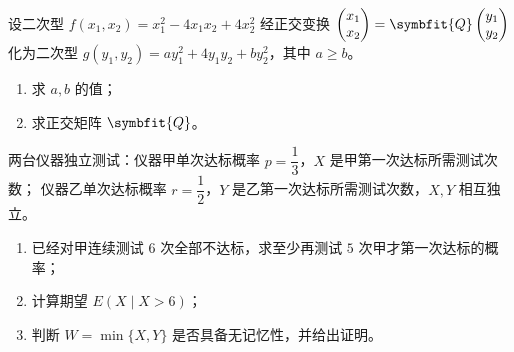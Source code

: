 \begin{question}[index=21,points=12,show-points=true,points-prelabel={（本题满分},points-postlabel={分）},points-separate-par=false]
设二次型 $f(x_1,x_2)=x_1^2-4x_1x_2+4x_2^2$ 经正交变换
$\begin{pmatrix}x_1\\x_2\end{pmatrix}=\symbfit{Q}\begin{pmatrix}y_1\\y_2\end{pmatrix}$\\
化为二次型 $g(y_1,y_2)=ay_1^2+4y_1y_2+by_2^2$，其中 $a\ge b$。
\begin{enumerate}[label=（\Roman*）,leftmargin=2.6em,labelsep=.4em,itemsep=3pt,topsep=3pt]
\item 求 $a,b$ 的值；
\item 求正交矩阵 $\symbfit{Q}$。
\end{enumerate}
\end{question}

\begin{question}[index=22,points=12,show-points=true,points-prelabel={（本题满分},points-postlabel={分）},points-separate-par=false]
两台仪器独立测试：仪器甲单次达标概率 $p=\dfrac13$，$X$ 是甲第一次达标所需测试次数；
仪器乙单次达标概率 $r=\dfrac12$，$Y$ 是乙第一次达标所需测试次数，$X,Y$ 相互独立。
\begin{enumerate}[label=（\arabic*）,leftmargin=2.6em,labelsep=.4em,itemsep=3pt,topsep=3pt]
\item 已经对甲连续测试 $6$ 次全部不达标，求至少再测试 $5$ 次甲才第一次达标的概率；
\item 计算期望 $E(X\mid X>6)$；
\item 判断 $W=\min\{X,Y\}$ 是否具备无记忆性，并给出证明。
\end{enumerate}
\end{question}

